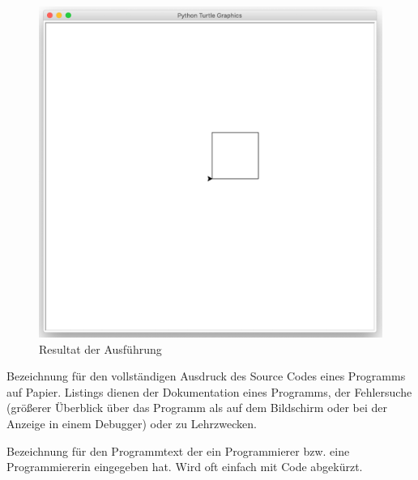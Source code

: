 \begin{example}[Titel]
\begin{figure}[htb]
\centering
\includegraphics[scale=0.15]{quadrat.png}
\caption{Resultat der Ausführung}
\label{figure-quadrat}
\end{figure}

\end{example}

\begin{vocabulary}
Bezeichnung für den vollständigen Ausdruck des Source Codes eines Programms auf Papier. Listings dienen der Dokumentation eines Programms, der Fehlersuche (größerer Überblick über das Programm als auf dem Bildschirm oder bei der Anzeige in einem Debugger) oder zu Lehrzwecken.
\end{vocabulary}

\vspace{0.25cm}

\begin{vocabulary}
Bezeichnung für den Programmtext der ein Programmierer bzw. eine Programmiererin eingegeben hat. Wird oft einfach mit Code abgekürzt.
\end{vocabulary}

